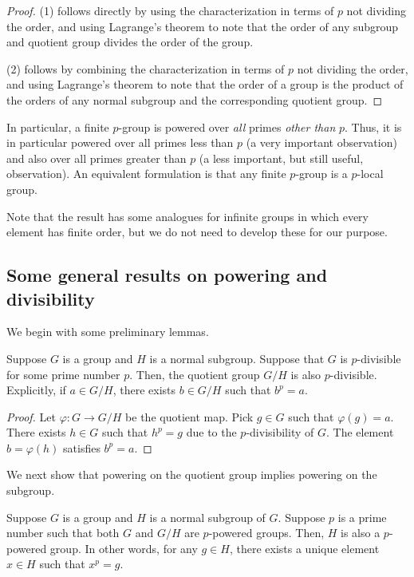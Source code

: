 \begin{proof}
  (1) follows directly by using the characterization in terms of $p$
  not dividing the order, and using Lagrange's theorem to note that
  the order of any subgroup and quotient group divides the order of
  the group.

  (2) follows by combining the characterization in terms of $p$ not
  dividing the order, and using Lagrange's theorem to note that the
  order of a group is the product of the orders of any normal subgroup
  and the corresponding quotient group.
\end{proof}

In particular, a finite $p$-group is powered over {\em all} primes
{\em other than} $p$. Thus, it is in particular powered over all
primes less than $p$ (a very important observation) and also over all
primes greater than $p$ (a less important, but still useful,
observation). An equivalent formulation is that any finite $p$-group
is a $p$-local group.

Note that the result has some analogues for infinite groups in which
every element has finite order, but we do not need to develop these
for our purpose.

\subsection{Some general results on powering and divisibility}

We begin with some preliminary lemmas.

\begin{lemma}\label{lemma:divisibility-inherit-quotient}
  Suppose $G$ is a group and $H$ is a normal subgroup. Suppose that
  $G$ is $p$-divisible for some prime number $p$. Then, the quotient
  group $G/H$ is also $p$-divisible. Explicitly, if $a \in G/H$, there
  exists $b \in G/H$ such that $b^p = a$.
\end{lemma}

\begin{proof}
  Let $\varphi:G \to G/H$ be the quotient map. Pick $g \in G$ such that
  $\varphi(g) = a$. There exists $h \in G$ such that $h^p = g$ due to the
  $p$-divisibility of $G$. The element $b = \varphi(h)$ satisfies $b^p = a$.
\end{proof}

We next show that powering on the quotient group implies powering on
the subgroup.

\begin{lemma}\label{lemma:quottosub}
  Suppose $G$ is a group and $H$ is a normal subgroup of $G$. Suppose
  $p$ is a prime number such that both $G$ and $G/H$ are $p$-powered
  groups. Then, $H$ is also a $p$-powered group. In other words, for
  any $g \in H$, there exists a unique element $x \in H$ such that $x^p
  =g$.
\end{lemma}

